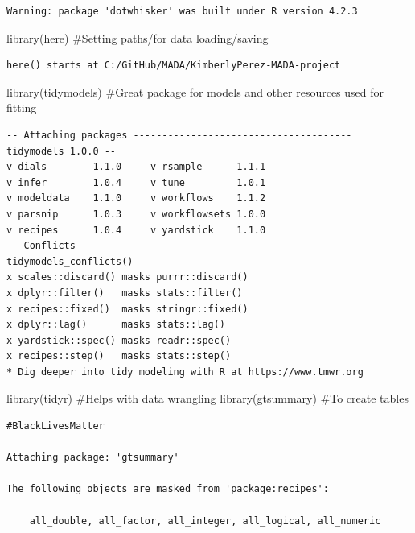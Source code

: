 \documentclass[
  letterpaper,
  DIV=11,
  numbers=noendperiod]{scrartcl}
\newenvironment{Shaded}{}{}
\newcommand{\CommentTok}[1]{\textcolor[rgb]{0.42,0.45,0.49}{#1}}
\newcommand{\FunctionTok}[1]{\textcolor[rgb]{0.44,0.26,0.76}{#1}}
\newcommand{\NormalTok}[1]{\textcolor[rgb]{0.14,0.16,0.18}{#1}}
\begin{document}
\begin{verbatim}
Warning: package 'dotwhisker' was built under R version 4.2.3
\end{verbatim}

\begin{Shaded}
\begin{Highlighting}[]
\FunctionTok{library}\NormalTok{(here) }\CommentTok{\#Setting paths/for data loading/saving}
\end{Highlighting}
\end{Shaded}

\begin{verbatim}
here() starts at C:/GitHub/MADA/KimberlyPerez-MADA-project
\end{verbatim}

\begin{Shaded}
\begin{Highlighting}[]
\FunctionTok{library}\NormalTok{(tidymodels) }\CommentTok{\#Great package for models and other resources used for fitting}
\end{Highlighting}
\end{Shaded}

\begin{verbatim}
-- Attaching packages -------------------------------------- tidymodels 1.0.0 --
v dials        1.1.0     v rsample      1.1.1
v infer        1.0.4     v tune         1.0.1
v modeldata    1.1.0     v workflows    1.1.2
v parsnip      1.0.3     v workflowsets 1.0.0
v recipes      1.0.4     v yardstick    1.1.0
-- Conflicts ----------------------------------------- tidymodels_conflicts() --
x scales::discard() masks purrr::discard()
x dplyr::filter()   masks stats::filter()
x recipes::fixed()  masks stringr::fixed()
x dplyr::lag()      masks stats::lag()
x yardstick::spec() masks readr::spec()
x recipes::step()   masks stats::step()
* Dig deeper into tidy modeling with R at https://www.tmwr.org
\end{verbatim}

\begin{Shaded}
\begin{Highlighting}[]
\FunctionTok{library}\NormalTok{(tidyr) }\CommentTok{\#Helps with data wrangling}
\FunctionTok{library}\NormalTok{(gtsummary) }\CommentTok{\#To create tables }
\end{Highlighting}
\end{Shaded}

\begin{verbatim}
#BlackLivesMatter

Attaching package: 'gtsummary'

The following objects are masked from 'package:recipes':

    all_double, all_factor, all_integer, all_logical, all_numeric
\end{verbatim}
\end{document}
